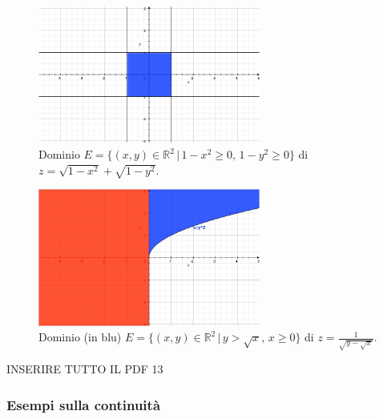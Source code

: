\begin{example}
    \begin{figure}
    \centering
    \includegraphics[width=0.65\textwidth]{Analisi2/figures/dominio_rad_1-x^2+rad_1-y^2.jpg}
        \caption{Dominio $E=\{(x,y)\in\mathbb R^2\,|\, 1-x^2\geq 0,\, 1-y^2\geq 0\}$ di $z=\sqrt{1-x^2}+\sqrt{1-y^2}$.}\label{fig:dominio_rad_1-x^2+rad_1-y^2}
    \end{figure}

    \begin{figure}
    \centering
    \includegraphics[width=0.65\textwidth]{Analisi2/figures/domino_frac_1_rad_y-radx.jpg}
        \caption{Dominio (in blu) $E=\{(x,y)\in\mathbb R^2\,|\, y>\sqrt{x},\, x\geq 0\}$ di $z=\frac{1}{\sqrt{y-\sqrt{x}}}$.}\label{fig:domino_frac_1_rad_y-radx}
    \end{figure}
\end{example}

INSERIRE TUTTO IL PDF 13

\subsubsection{Esempi sulla continuità}

